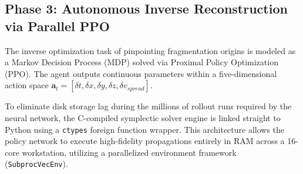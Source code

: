 \documentclass[conf]{AAS} %
\begin{document}
\subsection{Phase 3: Autonomous Inverse Reconstruction via Parallel PPO}
The inverse optimization task of pinpointing fragmentation origins is modeled as a Markov Decision Process (MDP) solved via Proximal Policy Optimization (PPO). The agent outputs continuous parameters within a five-dimensional action space $\mathbf{a}_t = [\delta t, \delta x, \delta y, \delta z, \delta v_{spread}]$. 

To eliminate disk storage lag during the millions of rollout runs required by the neural network, the C-compiled symplectic solver engine is linked straight to Python using a \texttt{ctypes} foreign function wrapper. This architecture allows the policy network to execute high-fidelity propagations entirely in RAM across a 16-core workstation, utilizing a parallelized environment framework (\texttt{SubprocVecEnv}).
\end{document}
